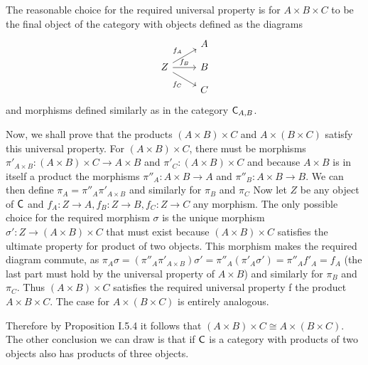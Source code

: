 \begin{solution}
	The reasonable choice for the required universal property is for $A \times B \times C$ to be the final object of the category with objects defined as the diagrams
	\begin{equation*}
		\begin{tikzcd}[row sep=small]
			& A \\
			Z \arrow[ur, "f_A"]
			  \arrow[r, "f_B"]
			  \arrow[dr, "f_C" swap] & B \\
			& C
		\end{tikzcd}
	\end{equation*}
	and morphisms defined similarly as in the category $\mathsf{C}_{A,B}$.
	
	Now, we shall prove that the products $(A \times B) \times C$ and $A \times (B \times C)$ satisfy this universal property. For $(A \times B) \times C$, there must be morphisms $\pi'_{A \times B}: (A \times B) \times C \to A \times B$ and $\pi'_C: (A \times B) \times C$ and because $A \times B$ is in itself a product the morphisms $\pi''_A: A \times B \to A$ and $\pi''_B: A \times B \to B$. We can then define $\pi_A = \pi''_A \pi'_{A \times B}$ and similarly for $\pi_B$ and $\pi_C$ Now let $Z$ be any object of $\mathsf{C}$ and $f_A: Z \to A, f_B: Z \to B, f_C: Z \to C$ any morphism. The only possible choice for the required morphism $\sigma$ is the unique morphism $\sigma': Z \to (A \times B) \times C$ that must exist because $(A \times B) \times C$ satisfies the ultimate property for product of two objects. This morphism makes the required diagram commute, as $\pi_A\sigma=(\pi''_A \pi'_{A \times B}) \sigma' = \pi''_A (\pi'_A \sigma') = \pi''_A f'_A = f_A$ (the last part must hold by the universal property of $A \times B$) and similarly for $\pi_B$ and $\pi_C$. Thus $(A \times B) \times C$ satisfies the required universal property f the product $A \times B \times C$. The case for $A \times (B \times C)$ is entirely analogous.
	
	Therefore by Proposition I.5.4 it follows that $(A \times B) \times C \cong A \times (B \times C)$. The other conclusion we can draw is that if $\mathsf{C}$ is a category with products of two objects also has products of three objects.
\end{solution}

\begin{problem}
\end{problem}

